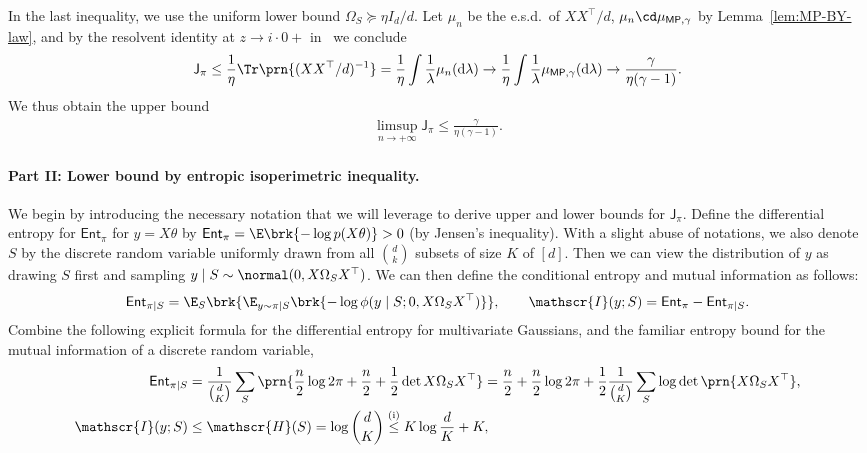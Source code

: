 \documentclass[11pt]{article}
\newcommand{\de}{\mathrm{d}}
\newcommand{\jfunc}{\mathsf{J}}
\begin{document}
In the last inequality, we use the uniform lower bound $\Omega_S \succeq \eta I_d/d$. Let $\mu_n$ be the e.s.d.\ of $XX^\top/d$, $\mu_n \cd \mu_{\mathsf{MP}, \gamma}$ by Lemma~\ref{lem:MP-BY-law}, and by the resolvent identity at $z \to i \cdot 0+$ in~\cite[Lemma~3.11]{bai2010spectral} we conclude
\begin{align*}
    \jfunc_{\pi}\leq \frac{1}{\eta} \Tr \prn{(XX^\top/d)^{-1}} =\frac{1}{\eta}\int \frac{1}{\lambda} \mu_n(\de \lambda) \to \frac{1}{\eta}\int \frac{1}{\lambda} \mu_{\mathsf{MP}, \gamma}(\de \lambda) \to \frac{\gamma}{\eta(\gamma-1)}.
\end{align*}
We thus obtain the upper bound
\begin{align*}
    \limsup_{n \to +\infty} \jfunc_\pi \leq \frac{\gamma}{\eta(\gamma-1)}.
\end{align*}
\paragraph{Part II: Lower bound by entropic isoperimetric inequality.} We begin by introducing the necessary notation that we will leverage to derive upper and lower bounds for $\jfunc_\pi$. Define the differential entropy for $\mathsf{Ent}_\pi$ for $y=X\theta$ by $\mathsf{Ent}_\pi = \E \brk{-\log p(X\theta)} > 0$ (by Jensen's inequality). With a slight abuse of notations, we also denote $S$ by the discrete random variable uniformly drawn from all $\binom{d}{k}$ subsets of size $K$ of $[d]$. Then we can view the distribution of $y$ as drawing $S$ first and sampling $y \mid S \sim \normal(0, X\Omega_S X^\top)$. We can then define the conditional entropy and mutual information as follows:
\begin{align*}
    \mathsf{Ent}_{\pi \mid S} = \E_S \brk{\E_{y \sim \pi \mid S} \brk{-\log \phi(y \mid S;0, X\Omega_SX^\top)}}, \qquad \mathscr{I}(y; S) = \mathsf{Ent}_{\pi}-\mathsf{Ent}_{\pi \mid S}.
\end{align*}
Combine the following explicit formula for the differential entropy for multivariate Gaussians, and the familiar entropy bound for the mutual information of a discrete random variable,
\begin{align*}
    \mathsf{Ent}_{\pi \mid S} & = \frac{1}{\binom{d}{K}} \sum_S \prn{\frac{n}{2} \log 2 \pi  + \frac{n}{2} + \frac{1}{2} \det X \Omega_S X^\top} = \frac{n}{2} + \frac{n}{2} \log 2 \pi + \frac{1}{2} \frac{1}{\binom{d}{K}} \sum_S \log \det \prn{X \Omega_S X^\top}, \\
    \mathscr{I}(y; S) & \leq \mathscr{H}(S) = \log \binom{d}{K} \stackrel{\mathrm{(i)}}{\leq} K \log \frac{d}{K} + K, 
\end{align*}
\end{document}
